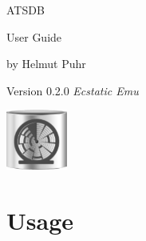 \documentclass[10pt,letterpaper,extrafontsizes]{memoir}
\begin{document}
\firmlists
\midsloppy
\raggedbottom


%

\frontmatter
\pagestyle{empty}


\vspace*{\fill}
\begin{center}
\HUGE\textsf{ATSDB}\par
\end{center}

\begin{center}
\Huge\textsf{User Guide}\par
\end{center}
\begin{center}
\normalsize\textsf{by Helmut Puhr}\par
\medskip
\normalsize\textsf{Version 0.2.0 \textit{Ecstatic Emu}}\par
\end{center}
\vspace*{\fill}
\begin{center}
\includegraphics[width=2cm]{../logo/atsdb.png}
\setlength{\droptitle}{0pt}%
\end{center}
\clearpage

\cleardoublepage

\pagestyle{headings}

\setupshorttoc
\tableofcontents
\clearpage
\setupparasubsecs
\setupmaintoc
\tableofcontents
\setlength{\unitlength}{1pt}
\clearpage
\listoffigures
\clearpage
\listoftables
\clearpage









\chapter{Usage}
\label{sec:usage}


\end{document}
